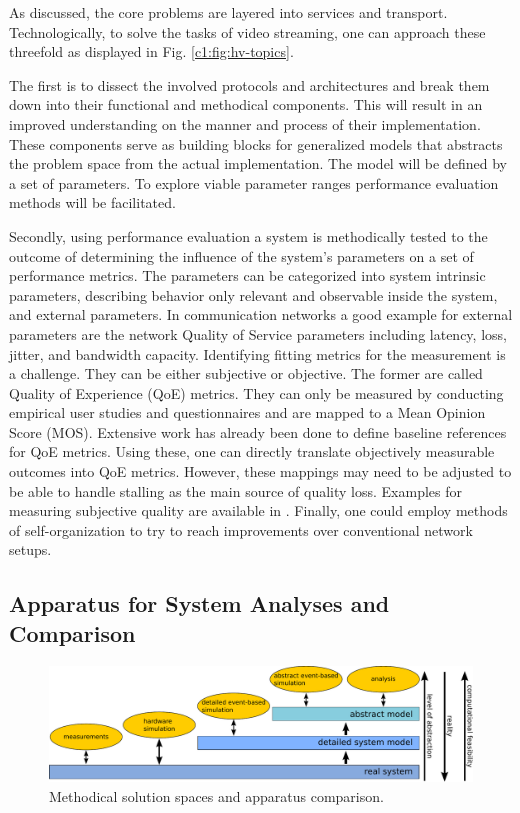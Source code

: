 As discussed, the core problems are layered into services and transport. Technologically, to solve the tasks of video streaming, one can approach these  threefold as displayed in Fig. \ref{c1:fig:hv-topics}.

The first is to dissect the involved protocols and architectures and break them down into their functional and methodical components. This will result in an improved understanding on the manner and process of their implementation. These components serve as building blocks for generalized models that abstracts the problem space from the actual implementation. The model will be defined by a set of parameters. To explore viable parameter ranges performance evaluation methods will be facilitated.


Secondly, using performance evaluation a system is methodically tested to the outcome of determining the influence of the system's parameters on a set of performance metrics. The parameters can be categorized into system intrinsic parameters, describing behavior only relevant and observable inside the system, and external parameters. In communication networks a good example for external parameters are the network Quality of Service parameters including latency, loss, jitter, and bandwidth capacity. Identifying fitting metrics for the measurement is a challenge. They can be either subjective or objective. The former are called Quality of Experience (QoE) metrics. They can only be measured by conducting empirical user studies and questionnaires and are mapped to a Mean Opinion Score (MOS). Extensive work has already been done to define baseline references for QoE metrics. Using these, one can directly translate objectively measurable outcomes into QoE metrics. However, these mappings may need to be adjusted to be able to handle stalling as the main source of quality loss. Examples for measuring subjective quality are available in \cite{gustafsson2008measuring, ketyo2010qoe}. 
Finally, one could employ methods of self-organization to try to reach improvements over conventional network setups.


\subsection{Apparatus for System Analyses and Comparison}

\begin{figure}[htbp]
    \centering
    \includegraphics[width=1.0\textwidth]{images/apparatus-new.pdf}
    \caption{Methodical solution spaces and apparatus comparison.}
    \label{c1:fig:appcomp}
\end{figure}

